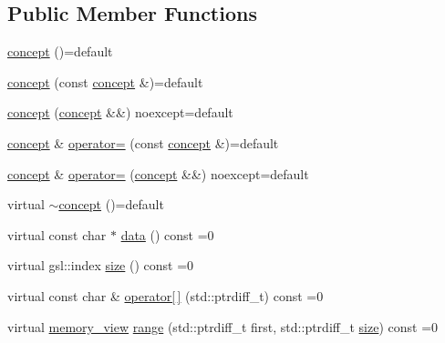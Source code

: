 \subsection*{Public Member Functions}
\begin{DoxyCompactItemize}
\item 
\mbox{\hyperlink{structirk_1_1memory__view_1_1concept_aae5e17857dc0611f3e09e9cbba9b0f57}{concept}} ()=default
\item 
\mbox{\hyperlink{structirk_1_1memory__view_1_1concept_a787ef96617397fef8d73a000a640528d}{concept}} (const \mbox{\hyperlink{structirk_1_1memory__view_1_1concept}{concept}} \&)=default
\item 
\mbox{\hyperlink{structirk_1_1memory__view_1_1concept_ae801147171040b17412295df48ea1275}{concept}} (\mbox{\hyperlink{structirk_1_1memory__view_1_1concept}{concept}} \&\&) noexcept=default
\item 
\mbox{\hyperlink{structirk_1_1memory__view_1_1concept}{concept}} \& \mbox{\hyperlink{structirk_1_1memory__view_1_1concept_a351a0e0485d2caf8de0f85678fa0de14}{operator=}} (const \mbox{\hyperlink{structirk_1_1memory__view_1_1concept}{concept}} \&)=default
\item 
\mbox{\hyperlink{structirk_1_1memory__view_1_1concept}{concept}} \& \mbox{\hyperlink{structirk_1_1memory__view_1_1concept_aff127d831dbed4a0e4f143e69ba639b0}{operator=}} (\mbox{\hyperlink{structirk_1_1memory__view_1_1concept}{concept}} \&\&) noexcept=default
\item 
virtual \mbox{\hyperlink{structirk_1_1memory__view_1_1concept_a970a71a31247472092552d2358968116}{$\sim$concept}} ()=default
\item 
virtual const char $\ast$ \mbox{\hyperlink{structirk_1_1memory__view_1_1concept_a9e124ac4016556f7cf7fd864dcc43a7c}{data}} () const =0
\item 
virtual gsl\+::index \mbox{\hyperlink{structirk_1_1memory__view_1_1concept_ae280e124e776a61562f6a97b2fa7d655}{size}} () const =0
\item 
virtual const char \& \mbox{\hyperlink{structirk_1_1memory__view_1_1concept_af36b274207af910870d186a747b9f9f1}{operator\mbox{[}$\,$\mbox{]}}} (std\+::ptrdiff\+\_\+t) const =0
\item 
virtual \mbox{\hyperlink{classirk_1_1memory__view}{memory\+\_\+view}} \mbox{\hyperlink{structirk_1_1memory__view_1_1concept_a9abcd2995563487390e941cf502b322c}{range}} (std\+::ptrdiff\+\_\+t first, std\+::ptrdiff\+\_\+t \mbox{\hyperlink{structirk_1_1memory__view_1_1concept_ae280e124e776a61562f6a97b2fa7d655}{size}}) const =0
\end{DoxyCompactItemize}


